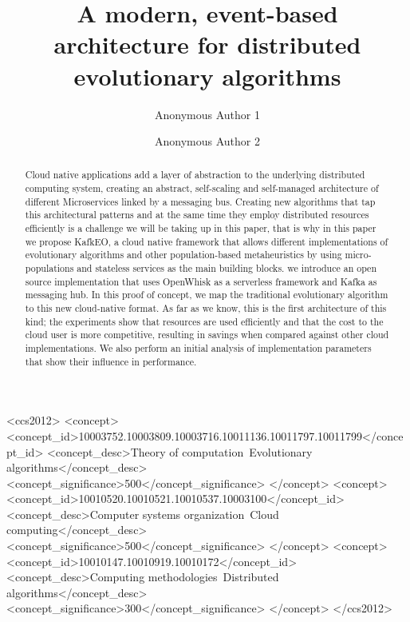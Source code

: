 \documentclass[sigconf]{acmart}
\begin{document}
\title{A modern, event-based architecture for distributed evolutionary algorithms}

\author{Anonymous Author 1}

\author{Anonymous Author 2}

\renewcommand{\shortauthors}{A. Author et al.}


\begin{abstract}
  Cloud native applications add a layer of abstraction to the
underlying distributed computing system, creating an abstract,
self-scaling and self-managed architecture of different Microservices
linked by a messaging bus. Creating new algorithms that tap this
architectural patterns and at the same time they employ distributed
resources efficiently is a challenge we will be taking up in this
paper, that is why in this paper we propose KafkEO, a cloud native
framework that allows different implementations of evolutionary
algorithms and other population-based metaheuristics by using
micro-populations and stateless services as the main building
blocks. we introduce an open source implementation that uses OpenWhisk
as a serverless framework and Kafka as messaging hub. In this proof of
concept, we map the traditional evolutionary algorithm to this new
cloud-native format.  As far as we know, this is the first
architecture of this kind; the experiments show that resources are
used efficiently and that the cost to the cloud user is more
competitive, resulting in savings when compared against other cloud
implementations. We also perform an initial analysis of implementation
parameters that show their influence in performance.
\end{abstract}

\begin{CCSXML}
<ccs2012>
<concept>
<concept_id>10003752.10003809.10003716.10011136.10011797.10011799</concept_id>
<concept_desc>Theory of computation~Evolutionary algorithms</concept_desc>
<concept_significance>500</concept_significance>
</concept>
<concept>
<concept_id>10010520.10010521.10010537.10003100</concept_id>
<concept_desc>Computer systems organization~Cloud computing</concept_desc>
<concept_significance>500</concept_significance>
</concept>
<concept>
<concept_id>10010147.10010919.10010172</concept_id>
<concept_desc>Computing methodologies~Distributed algorithms</concept_desc>
<concept_significance>300</concept_significance>
</concept>
</ccs2012>
\end{CCSXML}
\end{document}
